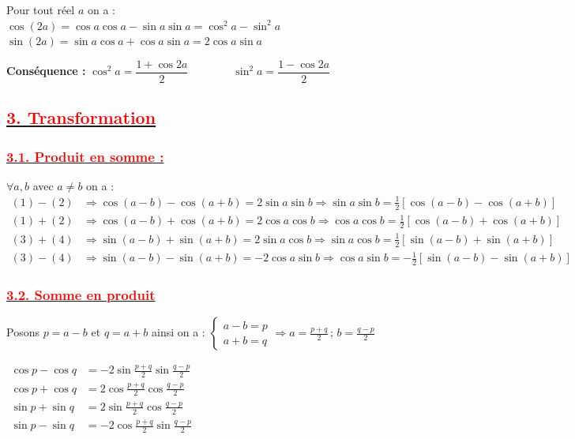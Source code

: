 \documentclass[12pt,a4paper]{article}
\begin{document}
Pour tout réel $a$ on a :\\
$\cos(2a) = \cos a \cos a - \sin a \sin a = \cos^2 a - \sin^2 a$\\
$\sin(2a) = \sin a \cos a + \cos a \sin a = 2 \cos a \sin a$

\vspace{0.4cm}

\textbf{Conséquence :}
$
\cos^2 a = \dfrac{1 + \cos 2a}{2} \qquad \qquad \sin^2 a = \dfrac{1 - \cos 2a}{2}
$

\subsection*{\underline{\textbf{\textcolor{red}{3. Transformation }}}}

\subsubsection*{\underline{\textbf{\textcolor{red}{3.1. Produit en somme : }}}}
$\forall a, b$ avec $a \neq b$ on a :
\begin{align*}
(1) - (2) &\Rightarrow \cos(a-b) - \cos(a+b) = 2 \sin a \sin b \Rightarrow \sin a \sin b = \tfrac{1}{2}[\cos(a-b) - \cos(a+b)] \\[0.2cm]
(1) + (2) &\Rightarrow \cos(a-b) + \cos(a+b) = 2 \cos a \cos b \Rightarrow \cos a \cos b = \tfrac{1}{2}[\cos(a-b) + \cos(a+b)] \\[0.2cm]
(3) + (4) &\Rightarrow \sin(a-b) + \sin(a+b) = 2 \sin a \cos b \Rightarrow \sin a \cos b = \tfrac{1}{2}[\sin(a-b) + \sin(a+b)] \\[0.2cm]
(3) - (4) &\Rightarrow \sin(a-b) - \sin(a+b) = -2 \cos a \sin b \Rightarrow \cos a \sin b = -\tfrac{1}{2}[\sin(a-b) - \sin(a+b)]
\end{align*}


\vspace{0.2cm}

\subsubsection*{\underline{\textbf{\textcolor{red}{3.2. Somme en produit }}}}

Posons $p = a - b$ et $q = a + b$ ainsi on a : 
$\begin{cases} a - b = p \\ a + b = q \end{cases} \Rightarrow a = \frac{p+q}{2} \,;\, b = \frac{q-p}{2}$

$\begin{aligned}
\cos p - \cos q &= -2 \sin \frac{p+q}{2} \sin \frac{q-p}{2} \\[0.3cm]
\cos p + \cos q &= 2 \cos \frac{p+q}{2} \cos \frac{q-p}{2} \\[0.3cm]
\sin p + \sin q &= 2 \sin \frac{p+q}{2} \cos \frac{q-p}{2} \\[0.3cm]
\sin p - \sin q &= -2 \cos \frac{p+q}{2} \sin \frac{q-p}{2}
\end{aligned}$
\end{document}
